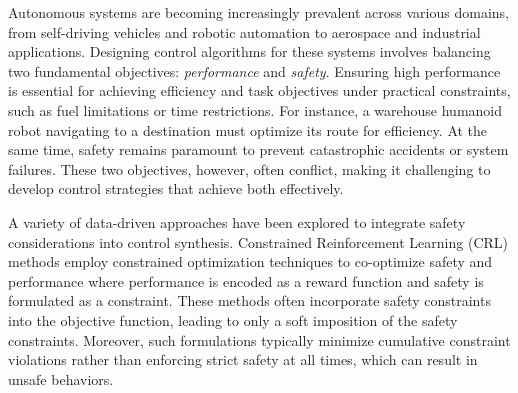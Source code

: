 % 
Autonomous systems are becoming increasingly prevalent across various domains, from self-driving vehicles and robotic automation to aerospace and industrial applications. 
Designing control algorithms for these systems involves balancing two fundamental objectives: \textit{performance} and \textit{safety}. 
Ensuring high performance is essential for achieving efficiency and task objectives under practical constraints, such as fuel limitations or time restrictions.
For instance, a warehouse humanoid robot navigating to a destination must optimize its route for efficiency.
At the same time, safety remains paramount to prevent catastrophic accidents or system failures. 
These two objectives, however, often conflict, making it challenging to develop control strategies that achieve both effectively.

A variety of data-driven approaches have been explored to integrate safety considerations into control synthesis. 
Constrained Reinforcement Learning (CRL) methods \cite{altman1999constrained, achiam2017constrained} employ constrained optimization techniques to co-optimize safety and performance where performance is encoded as a reward function and safety is formulated as a constraint. 
These methods often incorporate safety constraints into the objective function, leading to only a soft imposition of the safety constraints. Moreover, such formulations typically minimize cumulative constraint violations rather than enforcing strict safety at all times, which can result in unsafe behaviors. 

